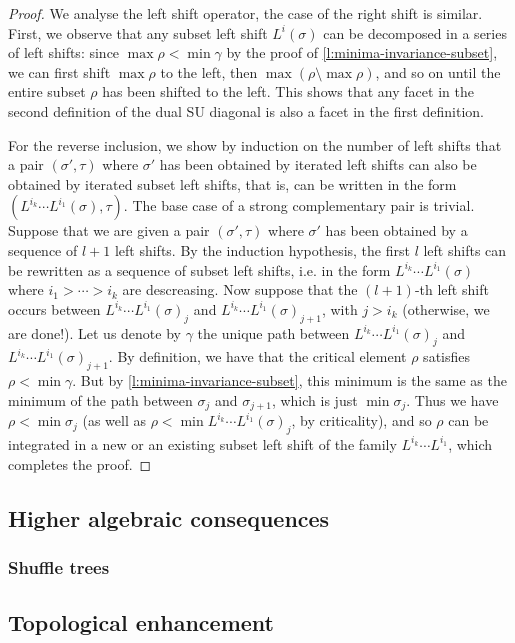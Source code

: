 \begin{proof}
    We analyse the left shift operator, the case of the right shift is similar. 
    First, we observe that any subset left shift $L^{i}(\sigma)$ can be decomposed in a series of left shifts: since $\max \rho < \min \gamma$ by the proof of \cref{l:minima-invariance-subset}, we can first shift $\max \rho$ to the left, then $\max (\rho \setminus \max \rho)$, and so on until the entire subset $\rho$ has been shifted to the left. 
    This shows that any facet in the second definition of the dual SU diagonal is also a facet in the first definition. 

    For the reverse inclusion, we show by induction on the number of left shifts that a pair $(\sigma',\tau)$ where $\sigma'$ has been obtained by iterated left shifts can also be obtained by iterated subset left shifts, that is, can be written in the form $(L^{i_k}\cdots L^{i_1}(\sigma), \tau)$.
    The base case of a strong complementary pair is trivial. 
    Suppose that we are given a pair $(\sigma',\tau)$ where $\sigma'$ has been obtained by a sequence of $l+1$ left shifts. 
    By the induction hypothesis, the first $l$ left shifts can be rewritten as a sequence of subset left shifts, i.e. in the form $L^{i_k}\cdots L^{i_1}(\sigma)$ where $i_1 > \cdots > i_k$ are descreasing.
    Now suppose that the $(l+1)$-th left shift occurs between $L^{i_k}\cdots L^{i_1}(\sigma)_j$ and $L^{i_k}\cdots L^{i_1}(\sigma)_{j+1}$, with $j> i_k$ (otherwise, we are done!). 
    Let us denote by $\gamma$ the unique path between $L^{i_k}\cdots L^{i_1}(\sigma)_j$ and $L^{i_k}\cdots L^{i_1}(\sigma)_{j+1}$.
    By definition, we have that the critical element $\rho$ satisfies $\rho < \min \gamma$.  
    But by \cref{l:minima-invariance-subset}, this minimum is the same as the minimum of the path between $\sigma_j$ and $\sigma_{j+1}$, which is just $\min \sigma_j$. 
    Thus we have $\rho < \min \sigma_j$ (as well as $\rho < \min L^{i_k}\cdots L^{i_1}(\sigma)_j$, by criticality), and so $\rho$ can be integrated in a new or an existing subset left shift of the family $L^{i_k}\cdots L^{i_1}$, which completes the proof. 
\end{proof}

\subsection{Higher algebraic consequences}

\subsubsection{Shuffle trees}

\subsection{Topological enhancement}






